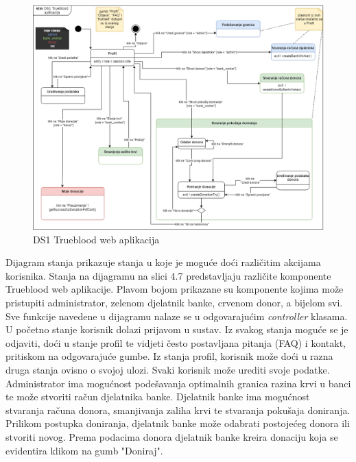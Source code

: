 	\begin{figure}[H]
        \includegraphics[scale=0.35]{slike/DS1_1.png}
    	\centering
    	\caption{DS1 Trueblood web aplikacija}
    	\label{fig:ds1}
    \end{figure}
    
    \par {
        \text Dijagram stanja prikazuje stanja u koje je moguće doći različitim akcijama korisnika. Stanja na dijagramu na slici 4.7 predstavljaju različite komponente Trueblood web aplikacije. Plavom bojom prikazane su komponente kojima može pristupiti administrator, zelenom djelatnik banke, crvenom donor, a bijelom svi. Sve funkcije navedene u dijagramu nalaze se u odgovarajućim \textit{controller} klasama. U početno stanje korisnik dolazi prijavom u sustav. Iz svakog stanja moguće se je odjaviti, doći u stanje profil te vidjeti često postavljana pitanja (FAQ) i kontakt, pritiskom na odgovarajuće gumbe. Iz stanja profil, korisnik može doći u razna druga stanja ovisno o svojoj ulozi. Svaki korisnik može urediti svoje podatke. Administrator ima mogućnost podešavanja optimalnih granica razina krvi u banci te može stvoriti račun djelatnika banke. Djelatnik banke ima mogućnost stvaranja računa donora, smanjivanja zaliha krvi te stvaranja pokušaja doniranja. Prilikom postupka doniranja, djelatnik banke može odabrati postojećeg donora ili stvoriti novog. Prema podacima donora djelatnik banke kreira donaciju koja se evidentira klikom na gumb "Doniraj".}

			
